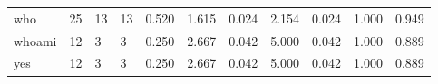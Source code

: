 \begin{longtable}{lp{1.8cm}p{1.8cm}p{1.8cm}p{1.8cm}p{1.8cm}p{1.8cm}p{1.8cm}p{1.8cm}p{1.8cm}p{1.8cm}}
who       &                           25 &                 13 &                                13 &                                      0.520 &                                  1.615 &                                        0.024 &                             2.154 &                                   0.024 &                              1.000 &                                              0.949 \\
whoami    &                           12 &                  3 &                                 3 &                                      0.250 &                                  2.667 &                                        0.042 &                             5.000 &                                   0.042 &                              1.000 &                                              0.889 \\
yes       &                           12 &                  3 &                                 3 &                                      0.250 &                                  2.667 &                                        0.042 &                             5.000 &                                   0.042 &                              1.000 &                                              0.889 \\
\end{longtable}
